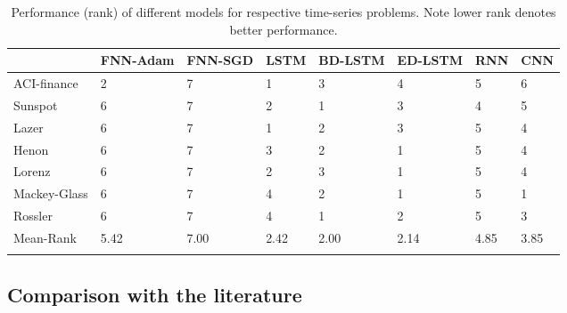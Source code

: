 \documentclass{ieeeaccess}
\begin{document}
\begin{comment}

\begin{figure*}[htb]
\centering
\subfigure[Step 1]{
\texttt{[image: Shaurya/Rossler/pred\_Step1copy.png]}
 }
 \subfigure[Step 3]{
\texttt{[image: Shaurya/Rossler/pred\_Step3copy.png]}
 }
 \subfigure[Step 5]{
\texttt{[image: Shaurya/Rossler/pred\_Step5copy.png]}
 }
 \subfigure[Step 10]{
\texttt{[image: Shaurya/Rossler/pred\_Step10copy.png]}
 }
\caption{Rossler actual vs predicted values for Encoder-Decoder LSTM Model}
\label{fig:rosslersingle}
\end{figure*}

 
 
\end{comment}

 
 
 
 
 
 
 
\begin{table*}[htbp!]
 \small 
 \centering
 \caption{Performance (rank) of different models for respective  time-series problems. Note lower rank denotes better performance. }
\label{tab:resultranks}
\begin{tabular}{llllllll}
\hline
 &  FNN-Adam& FNN-SGD & LSTM & BD-LSTM  & ED-LSTM & RNN & CNN\\
\hline
\hline
ACI-finance  &      
2&7&1&3&4&5&6\\
Sunspot &      
6&7&2&1&3&4&5\\
Lazer &      
6&7&1&2&3&5&4\\
Henon &      
6&7&3&2&1&5&4\\
Lorenz &      
6&7&2&3&1&5&4\\
Mackey-Glass &      
6&7&4&2&1&5&1\\
Rossler &      
6&7&4&1&2&5&3\\
\hline
Mean-Rank & 5.42 & 7.00  & 2.42  & 2.00  & 2.14  & 4.85  & 3.85 \\

\hline &
\end{tabular}

\end{table*}

 
 

 \subsection{Comparison with the literature}
  
 
 
\end{document}
